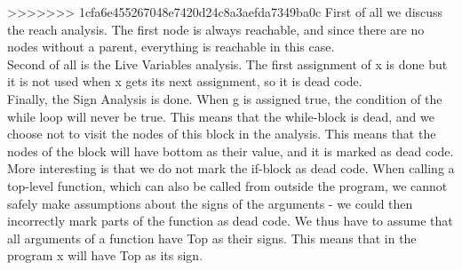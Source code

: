 \documentclass[10pt]{article}
\begin{document}
>>>>>>> 1cfa6e455267048e7420d24c8a3aefda7349ba0c
First of all we discuss the reach analysis. The first node is always reachable, and since there are no nodes without a parent, everything is reachable in this case.\\
Second of all is the Live Variables analysis. The first assignment of x is done but it is not used when x gets its next assignment, so it is dead code.\\
Finally, the Sign Analysis is done. When g is assigned true, the condition of the while loop will never be true. This means that the while-block is dead, and we choose not to visit the nodes of this block in the analysis. This means that the nodes of the block will have bottom as their value, and it is marked as dead code.\\
More interesting is that we do not mark the if-block as dead code. When calling a top-level function, which can also be called from outside the program, we cannot safely make assumptions about the signs of the arguments - we could then incorrectly mark parts of the function as dead code. We thus have to assume that all arguments of a function have Top as their signs. This means that in the program x will have Top as its sign.
\end{document}
